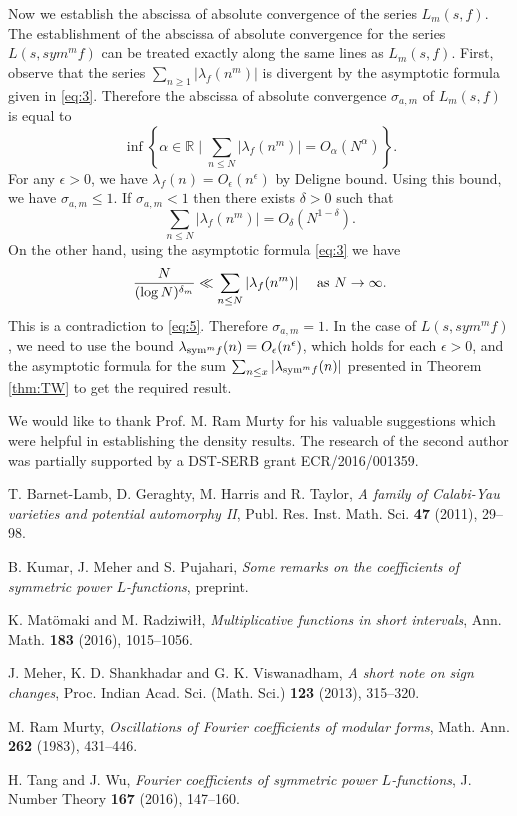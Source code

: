 \documentclass[12pt,a4paper,reqno]{amsart}
\begin{document}
Now we establish the abscissa of absolute convergence of the series $L_m(s, f)$. The establishment of the abscissa of absolute convergence for the series $L(s, sym^m f)$ can be treated exactly along the same lines as $L_m(s, f)$. First, observe that the series $\sum_{n \geq 1} \vert \lambda_f(n^m) \vert$ is divergent by the asymptotic formula given in \eqref{eq:3}.  Therefore the abscissa of absolute convergence $\sigma_{a,m}$ of $L_m(s,f)$ is equal to
$$
 \inf \left\{\alpha \in \mathbb{R} \mid \sum_{n \leq N} \vert \lambda_f(n^m) \vert 
= O_\alpha(N^\alpha) \right\}.
$$
For any $\epsilon>0$, we have  $ \lambda_f(n) = O_\epsilon(n^\epsilon)$ by Deligne bound. 
Using this bound, we have $\sigma_{a,m} \leq 1$. 
If $\sigma_{a,m} < 1$ then there exists  $\delta>0$ such that
\begin{equation}\label{eq:5}
\sum_{n \leq N} \vert \lambda_f(n^m) \vert = O_\delta (N^{1-\delta}).
\end{equation}
On the other hand, using the asymptotic formula \eqref{eq:3} we have
$$
\frac{N}{(\log N)^{\delta_m}} \ll \sum_{n \leq N} \vert \lambda_f(n^m) \vert \ 
\ \ \ {\rm as} \ N \rightarrow \infty.
$$
This is a contradiction to \eqref{eq:5}. Therefore
$\sigma_{a,m} =1$. 
In the case of $L(s,sym^m f)$, we need to use the bound 
$\lambda_{{\rm sym}^m f}(n) = O_\epsilon(n^\epsilon)$, which holds for each  $\epsilon >0$, and the 
asymptotic formula for the sum
$\sum_{n \leq x} \vert \lambda_{{\rm sym}^m f}(n) \vert$ presented in Theorem 
\ref{thm:TW} to get the required result.

\par
\par
{}  
We would like to thank Prof. M. Ram Murty for his valuable suggestions which were helpful in establishing the density results. The research of the second author was partially supported by a DST-SERB grant ECR/2016/001359.

\begin{thebibliography}{100}
 T. Barnet-Lamb, D. Geraghty, M. Harris and R. 
Taylor,  {\em A family of Calabi-Yau varieties and potential automorphy II}, 
Publ. Res. Inst. Math. Sci. {\bf 47} (2011), 29--98.

B. Kumar, J. Meher and S. Pujahari, {\em Some remarks on the coefficients of 
symmetric power $L$-functions}, preprint.

K. Mat{\"o}maki and M. Radziwi{\l}{\l}, {\em Multiplicative functions in short 
intervals}, Ann. Math. {\bf 183} (2016), 1015--1056.

J. Meher, K. D. Shankhadar and G. K. Viswanadham, {\em A short note on sign 
changes}, Proc. Indian Acad. Sci. (Math. Sci.) {\bf 123} (2013), 315--320.

M. Ram Murty, {\em Oscillations of Fourier coefficients of modular forms}, Math. 
Ann. {\bf 262} (1983), 431--446.

  H. Tang and J. Wu, {\em Fourier coefficients of symmetric power 
$L$-functions}, J. Number Theory {\bf 167} (2016), 147--160.

\end{thebibliography}
\end{document}
